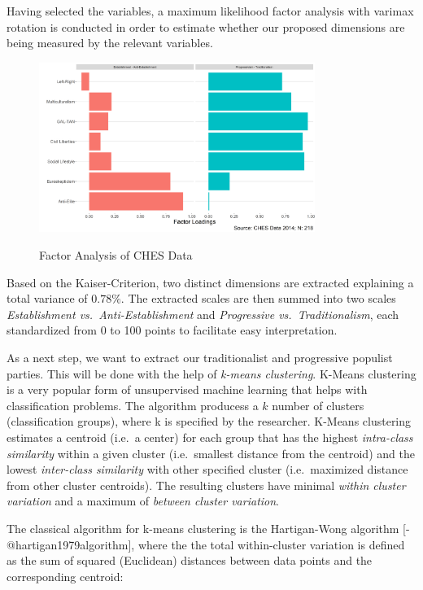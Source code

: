 \documentclass[]{article}
\begin{document}
Having selected the variables, a maximum likelihood factor analysis with
varimax rotation is conducted in order to estimate whether our proposed
dimensions are being measured by the relevant variables.

\begin{figure}[!h]
    \centering
    \caption{Factor Analysis of CHES Data}
    \includegraphics[width=0.8\textwidth]{images/fac_pop}
    \label{fig:mesh1}
\end{figure}

Based on the Kaiser-Criterion, two distinct dimensions are extracted
explaining a total variance of \(0.78\%\). The extracted scales are then
summed into two scales \emph{Establishment vs.~Anti-Establishment} and
\emph{Progressive vs.~Traditionalism}, each standardized from 0 to 100
points to facilitate easy interpretation.

As a next step, we want to extract our traditionalist and progressive
populist parties. This will be done with the help of \emph{k-means
clustering}. K-Means clustering is a very popular form of unsupervised
machine learning that helps with classification problems. The algorithm
producess a \(k\) number of clusters (classification groups), where k is
specified by the researcher. K-Means clustering estimates a centroid
(i.e.~a center) for each group that has the highest \emph{intra-class
similarity} within a given cluster (i.e.~smallest distance from the
centroid) and the lowest \emph{inter-class similarity} with other
specified cluster (i.e.~maximized distance from other cluster
centroids). The resulting clusters have minimal \emph{within cluster
variation} and a maximum of \emph{between cluster variation}.

The classical algorithm for k-means clustering is the Hartigan-Wong
algorithm {[}-@hartigan1979algorithm{]}, where the the total
within-cluster variation is defined as the sum of squared (Euclidean)
distances between data points and the corresponding centroid:
\end{document}
